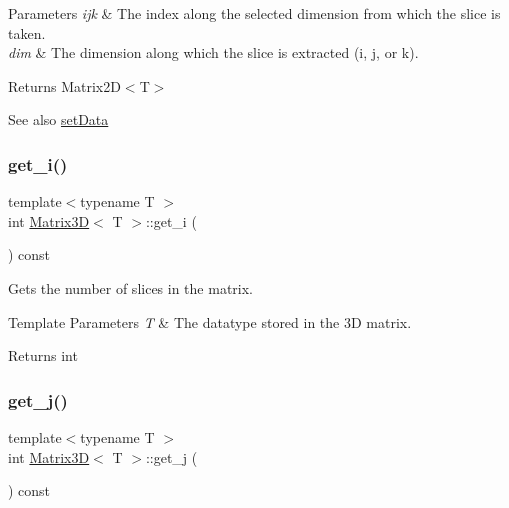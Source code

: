\begin{DoxyParams}{Parameters}
{\em ijk} & The index along the selected dimension from which the slice is taken. \\
\hline
{\em dim} & The dimension along which the slice is extracted (\textquotesingle{}i\textquotesingle{}, \textquotesingle{}j\textquotesingle{}, or \textquotesingle{}k\textquotesingle{}).\\
\hline
\end{DoxyParams}
\begin{DoxyReturn}{Returns}
Matrix2\+D$<$\+T$>$
\end{DoxyReturn}
\begin{DoxySeeAlso}{See also}
\mbox{\hyperlink{classMatrix3D_a056c035f4997b14c2a3e2b8ebee5142c}{set\+Data}} 
\end{DoxySeeAlso}
\mbox{\label{classMatrix3D_af02576e685de872ba1b75014d9a609c9}} 
\subsubsection{\texorpdfstring{get\+\_\+i()}{get\_i()}}
{\footnotesize\ttfamily template$<$typename T $>$ \\
int \mbox{\hyperlink{classMatrix3D}{Matrix3D}}$<$ T $>$\+::get\+\_\+i (\begin{DoxyParamCaption}{ }\end{DoxyParamCaption}) const}



Gets the number of slices in the matrix. 


\begin{DoxyTemplParams}{Template Parameters}
{\em T} & The datatype stored in the 3D matrix. \\
\hline
\end{DoxyTemplParams}
\begin{DoxyReturn}{Returns}
int 
\end{DoxyReturn}
\mbox{\label{classMatrix3D_a083e3f136a0108aad991e194b078db7f}} 
\subsubsection{\texorpdfstring{get\+\_\+j()}{get\_j()}}
{\footnotesize\ttfamily template$<$typename T $>$ \\
int \mbox{\hyperlink{classMatrix3D}{Matrix3D}}$<$ T $>$\+::get\+\_\+j (\begin{DoxyParamCaption}{ }\end{DoxyParamCaption}) const}



